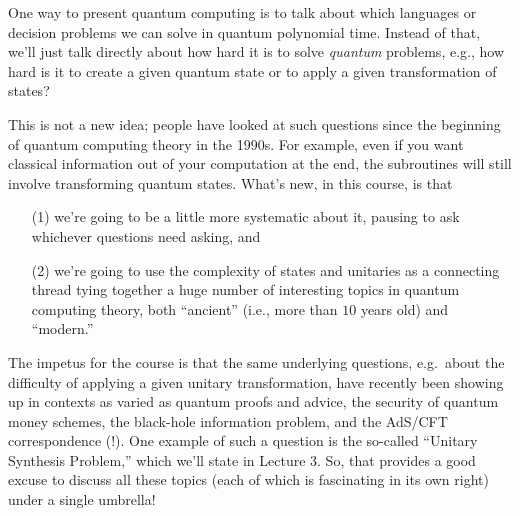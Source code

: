 \documentclass[12pt]{report}
\theoremstyle{plain}
\theoremstyle{definition}
\begin{document}
One way to present quantum computing is to talk about which languages or decision problems we can solve in quantum polynomial time. Instead of that, we'll just talk directly about how hard it is to solve {\em quantum} problems, e.g., how hard is it to create a given quantum state or to apply a given transformation of states?

This is not a new idea; people have looked at such questions since the beginning of quantum computing theory in the 1990s. For example, even if you want classical information out of your computation at the end, the subroutines will still involve transforming quantum states.  What's new, in this course, is that
\begin{enumerate}
\item[(1)] we're going to be a little more systematic about it, pausing to ask whichever questions need asking, and
\item[(2)] we're going to use the complexity of states and unitaries as a connecting thread tying together a huge number of interesting topics in quantum computing theory, both ``ancient'' (i.e., more than $10$ years old) and ``modern.''
\end{enumerate}

The impetus for the course is that the same underlying questions, e.g.\ about the difficulty of applying a given unitary transformation, have recently been showing up in contexts as varied as quantum proofs and advice, the security of quantum money schemes, the black-hole information problem, and the AdS/CFT correspondence (!). One example of such a question is the so-called ``Unitary Synthesis Problem,'' which we'll state in Lecture 3.  So, that provides a good excuse to discuss all these topics (each of which is fascinating in its own right) under a single umbrella!
\end{document}
